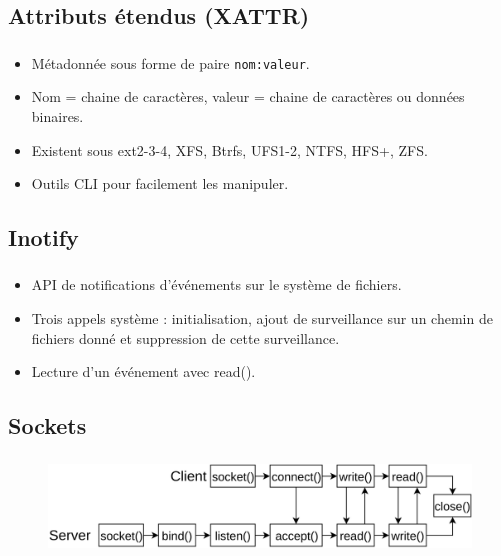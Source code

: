 \documentclass[10pt]{beamer}
\begin{document}
\subsection{Attributs étendus (XATTR)}
\begin{frame}
    \frametitle{\subsecname}
    \begin{itemize}
        \item Métadonnée sous forme de paire \texttt{nom:valeur}.
        \pause
        \item Nom = chaine de caractères, valeur = chaine de caractères ou données binaires.
        \pause
        \item Existent sous ext2-3-4, XFS, Btrfs, UFS1-2, NTFS, HFS+, ZFS.
        \pause
        \item Outils CLI pour facilement les manipuler.
    \end{itemize}
\end{frame}

\subsection{Inotify}
\begin{frame}
    \frametitle{\subsecname}
    \begin{itemize}
        \item API de notifications d'événements sur le système de fichiers.
        \pause
        \item Trois appels système : initialisation, ajout de surveillance sur un chemin de fichiers 
            donné et suppression de cette surveillance.
        \pause
        \item Lecture d'un événement avec read().
    \end{itemize}
\end{frame}

\subsection{Sockets}
\begin{frame}
    \frametitle{\subsecname}
    \begin{figure}
        \begin{center}
            \includegraphics[width=1\textwidth]{images/sockets2.png}
        \end{center}
    \end{figure}
\end{frame}
\end{document}
